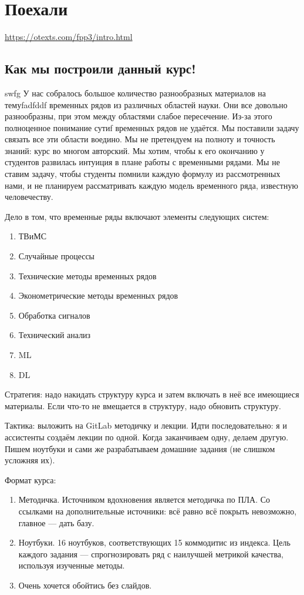 \chapter{Поехали}
\url{https://otexts.com/fpp3/intro.html}

\section{Как мы построили данный курс!}
swfg
У нас собралось большое количество разнообразных материалов на
темуfadfddf
временных рядов из различных областей науки. Они все
довольно разнообразны, при этом между областями слабое пересечение.
Из-за этого полноценное понимание сутиf
временных рядов не удаётся. Мы поставили задачу
связать все эти области воедино. Мы не претендуем на полноту и
точность знаний: курс во многом авторский. Мы хотим, чтобы к  его
окончанию у студентов развилась интуиция в плане работы с временными
рядами. Мы не ставим задачу, чтобы студенты помнили каждую формулу из
рассмотренных нами, и не планируем рассматривать каждую модель
временного ряда, известную человечеству.

Дело в том, что временные ряды включают элементы следующих систем:
\begin{enumerate}
  \item ТВиМС
  \item Случайные процессы
  \item Технические методы временных рядов
  \item Эконометрические методы временных рядов
  \item Обработка сигналов
  \item Технический анализ
  \item ML
  \item DL
\end{enumerate}

Стратегия: надо накидать структуру курса и затем включать в неё все
имеющиеся материалы. Если что-то не вмещается в структуру, надо
обновить структуру. 

Тактика: выложить на GitLab методичку и лекции. Идти последовательно:
я и ассистенты создаём лекции по одной. Когда заканчиваем одну,
делаем другую. Пишем ноутбуки и сами же разрабатываем домашние
задания (не слишком усложняя их).

Формат курса:
\begin{enumerate}
  \item Методичка. Источником вдохновения является методичка по ПЛА.
    Со ссылками на дополнительные источники: всё равно всё покрыть
    невозможно, главное — дать базу.
  \item Ноутбуки. 16 ноутбуков, соответствующих 15 коммодитис из
    индекса. Цель каждого задания — спрогнозировать ряд с наилучшей
    метрикой качества, используя изученные методы.
  \item Очень хочется обойтись без слайдов.
\end{enumerate}

